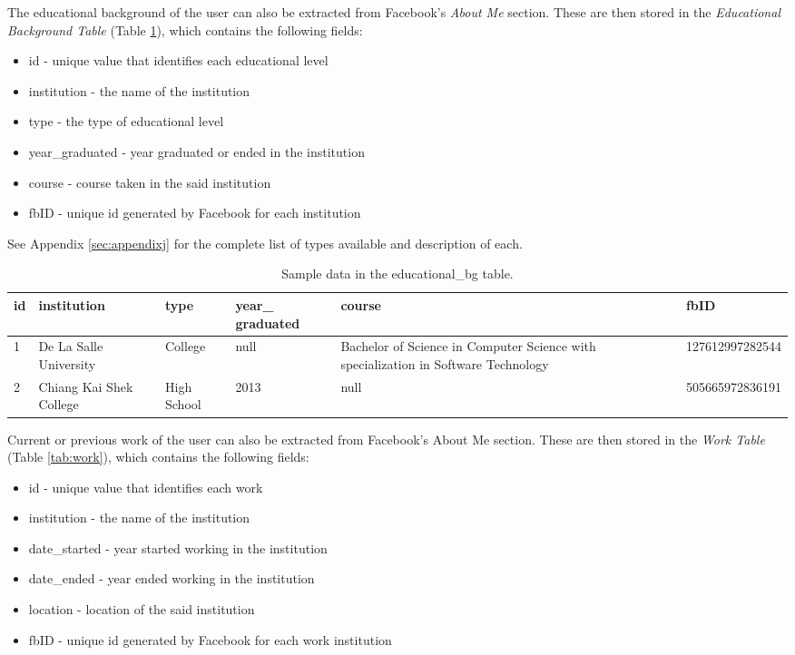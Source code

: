 The educational background of the user can also be extracted from Facebook's \textit{About Me} section. These are then stored in the \textit{Educational Background Table} (Table \ref{tab:EducationalBG}), which contains the following fields:
\begin{itemize}
	\item id - unique value that identifies each educational level
	\item institution - the name of the institution
	\item type - the type of educational level
	\item year\_graduated - year graduated or ended in the institution
	\item course - course taken in the said institution
	\item fbID - unique id generated by Facebook for each institution
\end{itemize}
See Appendix \ref{sec:appendixj} for the complete list of types available and description of each.

\begin{table}[ph!]   %
	\centering
	\caption{Sample data in the educational\_bg table.} \vspace{0.25em}
	\begin{tabular}{|p{.5cm}|p{1in}|p{1.5cm}|p{2cm}|p{2.5cm}|p{2cm}|} \hline
		\textbf{id} & \textbf{institution} & \textbf{type} & \textbf{year\_ \newline graduated} & \textbf{course} & \textbf{fbID} \\ \hline
		1 & De La Salle University & College & null & Bachelor of Science in Computer Science with specialization in Software Technology & 127612997282544\\ \hline
		2 & Chiang Kai Shek College & High School & 2013 & null & 505665972836191\\ \hline
	\end{tabular}
	\label{tab:EducationalBG}
\end{table}

Current or previous work of the user can also be extracted from Facebook's About Me section. These are then stored in the \textit{Work Table} (Table \ref{tab:work}), which contains the following fields:
\begin{itemize}
	\item id - unique value that identifies each work
	\item institution - the name of the institution
	\item date\_started - year started working in the institution
	\item date\_ended - year ended working in the institution
	\item location - location of the said institution
	\item fbID - unique id generated by Facebook for each work institution
\end{itemize}

